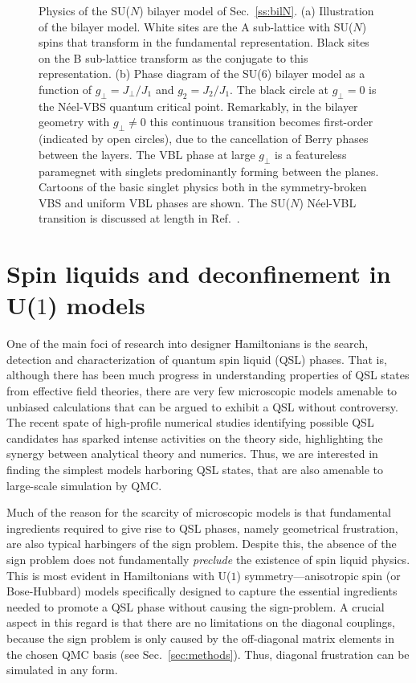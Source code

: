 \documentclass[range]{ar2e}
\begin{document}
\begin{figure}
\centerline{}
  \caption{ \label{fig:pd_bil}  Physics of the SU($N$) bilayer model  of Sec.~\ref{ss:bilN}.  (a) Illustration of the bilayer model. White sites are the A sub-lattice with 
  SU($N$) spins that transform in the fundamental representation. Black sites on the B sub-lattice transform as the conjugate to this representation. (b) Phase diagram of the
  SU($6$) bilayer model as a function of $g_\perp =J_\perp/J_1$ and $g_2=J_2/J_1$. The black circle at $g_\perp=0$ is the N\'eel-VBS quantum critical point. Remarkably, 
  in the bilayer geometry with $g_\perp\neq 0$ this continuous transition becomes first-order (indicated by open circles), due to the cancellation of Berry phases between 
  the layers. The VBL phase at large $g_\perp$ is a featureless paramegnet with singlets predominantly forming between the planes. Cartoons of the basic singlet physics 
  both in the symmetry-broken VBS and uniform VBL phases are shown. The SU($N$) N\'eel-VBL transition is discussed at length in Ref.~\cite{kaul2012:sun_bil}.}
\end{figure}

\section{Spin liquids and deconfinement in U($1$) models}
\label{sec:u1models}

One of the main foci of research into designer Hamiltonians is the search, detection and characterization of quantum spin liquid (QSL) phases.  That is, although there 
has been much progress in understanding properties of QSL states from effective field theories, there are very few microscopic models amenable to unbiased calculations 
that can be argued to exhibit a QSL without controversy. The recent spate of high-profile numerical studies identifying possible QSL candidates \cite{Yan,Meng,J1J2} has 
sparked intense activities on the theory side, highlighting the synergy between analytical theory and numerics. Thus, we are interested in finding the simplest models 
harboring QSL states, that are also amenable to large-scale simulation by QMC.

Much of the reason for the scarcity of microscopic models is that fundamental ingredients required to give rise to QSL phases, namely geometrical frustration, are also typical 
harbingers of the sign problem.  Despite this, the absence of the sign problem does not fundamentally {\it preclude} the existence of spin liquid physics.  This is most evident 
in Hamiltonians with U($1$) symmetry---anisotropic spin (or Bose-Hubbard) models specifically designed to capture the essential ingredients needed to promote a QSL phase without 
causing the sign-problem. A crucial aspect in this regard is that there are no limitations on the diagonal couplings, because the sign problem is only caused by the off-diagonal
matrix elements in the chosen QMC basis (see Sec.~\ref{sec:methods}). Thus, diagonal frustration can be simulated in any form.
\end{document}
